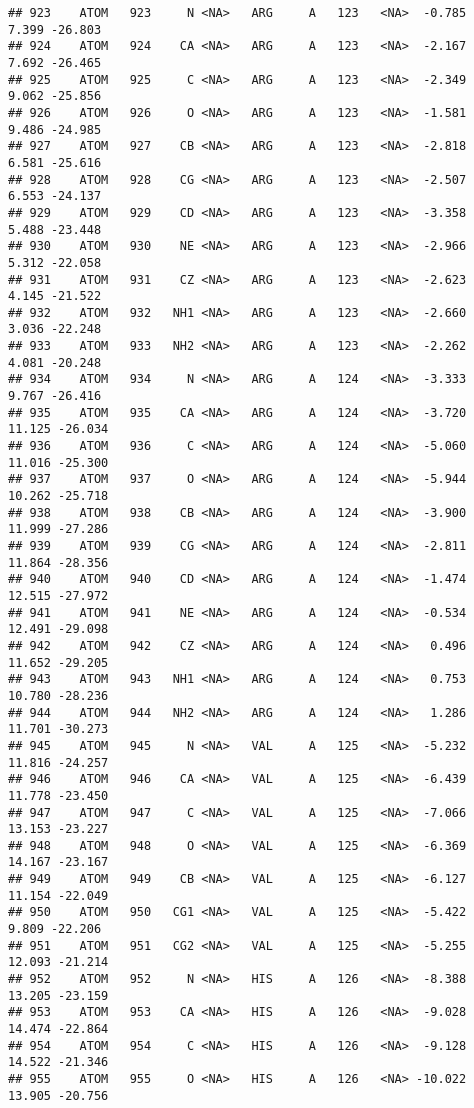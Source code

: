 \documentclass[
]{article}
\begin{document}
\begin{verbatim}
## 923    ATOM   923     N <NA>   ARG     A   123   <NA>  -0.785   7.399 -26.803
## 924    ATOM   924    CA <NA>   ARG     A   123   <NA>  -2.167   7.692 -26.465
## 925    ATOM   925     C <NA>   ARG     A   123   <NA>  -2.349   9.062 -25.856
## 926    ATOM   926     O <NA>   ARG     A   123   <NA>  -1.581   9.486 -24.985
## 927    ATOM   927    CB <NA>   ARG     A   123   <NA>  -2.818   6.581 -25.616
## 928    ATOM   928    CG <NA>   ARG     A   123   <NA>  -2.507   6.553 -24.137
## 929    ATOM   929    CD <NA>   ARG     A   123   <NA>  -3.358   5.488 -23.448
## 930    ATOM   930    NE <NA>   ARG     A   123   <NA>  -2.966   5.312 -22.058
## 931    ATOM   931    CZ <NA>   ARG     A   123   <NA>  -2.623   4.145 -21.522
## 932    ATOM   932   NH1 <NA>   ARG     A   123   <NA>  -2.660   3.036 -22.248
## 933    ATOM   933   NH2 <NA>   ARG     A   123   <NA>  -2.262   4.081 -20.248
## 934    ATOM   934     N <NA>   ARG     A   124   <NA>  -3.333   9.767 -26.416
## 935    ATOM   935    CA <NA>   ARG     A   124   <NA>  -3.720  11.125 -26.034
## 936    ATOM   936     C <NA>   ARG     A   124   <NA>  -5.060  11.016 -25.300
## 937    ATOM   937     O <NA>   ARG     A   124   <NA>  -5.944  10.262 -25.718
## 938    ATOM   938    CB <NA>   ARG     A   124   <NA>  -3.900  11.999 -27.286
## 939    ATOM   939    CG <NA>   ARG     A   124   <NA>  -2.811  11.864 -28.356
## 940    ATOM   940    CD <NA>   ARG     A   124   <NA>  -1.474  12.515 -27.972
## 941    ATOM   941    NE <NA>   ARG     A   124   <NA>  -0.534  12.491 -29.098
## 942    ATOM   942    CZ <NA>   ARG     A   124   <NA>   0.496  11.652 -29.205
## 943    ATOM   943   NH1 <NA>   ARG     A   124   <NA>   0.753  10.780 -28.236
## 944    ATOM   944   NH2 <NA>   ARG     A   124   <NA>   1.286  11.701 -30.273
## 945    ATOM   945     N <NA>   VAL     A   125   <NA>  -5.232  11.816 -24.257
## 946    ATOM   946    CA <NA>   VAL     A   125   <NA>  -6.439  11.778 -23.450
## 947    ATOM   947     C <NA>   VAL     A   125   <NA>  -7.066  13.153 -23.227
## 948    ATOM   948     O <NA>   VAL     A   125   <NA>  -6.369  14.167 -23.167
## 949    ATOM   949    CB <NA>   VAL     A   125   <NA>  -6.127  11.154 -22.049
## 950    ATOM   950   CG1 <NA>   VAL     A   125   <NA>  -5.422   9.809 -22.206
## 951    ATOM   951   CG2 <NA>   VAL     A   125   <NA>  -5.255  12.093 -21.214
## 952    ATOM   952     N <NA>   HIS     A   126   <NA>  -8.388  13.205 -23.159
## 953    ATOM   953    CA <NA>   HIS     A   126   <NA>  -9.028  14.474 -22.864
## 954    ATOM   954     C <NA>   HIS     A   126   <NA>  -9.128  14.522 -21.346
## 955    ATOM   955     O <NA>   HIS     A   126   <NA> -10.022  13.905 -20.756

\end{verbatim}
\end{document}
